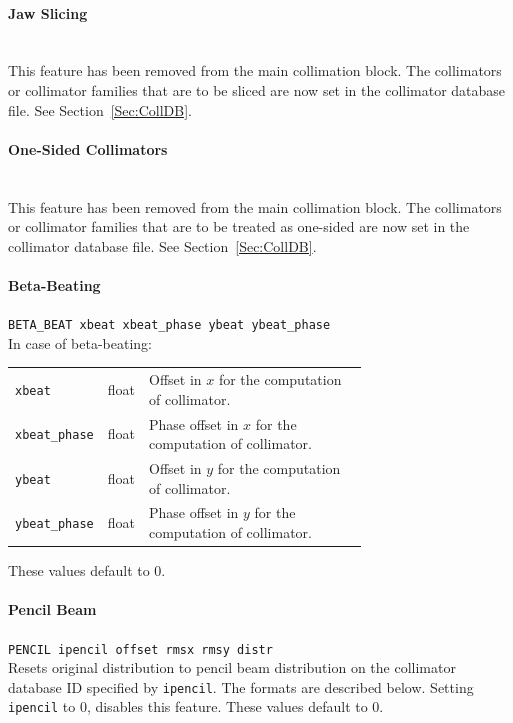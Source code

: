 \paragraph{Jaw Slicing}~\\

This feature has been removed from the main collimation block.
The collimators or collimator families that are to be sliced are now set in the collimator database file.
See Section~\ref{Sec:CollDB}.

\paragraph{One-Sided Collimators}~\\

This feature has been removed from the main collimation block.
The collimators or collimator families that are to be treated as one-sided are now set in the collimator database file.
See Section~\ref{Sec:CollDB}.

\paragraph{Beta-Beating} \texttt{BETA\_BEAT xbeat xbeat\_phase ybeat ybeat\_phase}\\

In case of beta-beating:

\bigskip
\begin{tabular}{@{}llp{0.7\linewidth}}
    \texttt{xbeat}        & float & Offset in $x$ for the computation of collimator. \\
    \texttt{xbeat\_phase} & float & Phase offset in $x$ for the computation of collimator. \\
    \texttt{ybeat}        & float & Offset in $y$ for the computation of collimator. \\
    \texttt{ybeat\_phase} & float & Phase offset in $y$ for the computation of collimator.
\end{tabular}

These values default to 0.

\paragraph{Pencil Beam} \texttt{PENCIL ipencil offset rmsx rmsy distr}\\

Resets original distribution to pencil beam distribution on the collimator database ID specified by \texttt{ipencil}.
The formats are described below.
Setting \texttt{ipencil} to 0, disables this feature.
These values default to 0.

